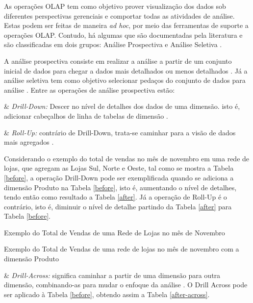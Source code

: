 As operações OLAP tem como objetivo prover visualização dos dados sob diferentes perspectivas gerenciais e comportar todas as atividades de análise. Estas podem ser feitas de maneira \textit{ad hoc}, por meio das ferramentas de suporte a operações OLAP. Contudo, há algumas que são documentadas pela literatura e são classificadas em dois grupos: Análise Prospectiva e Análise Seletiva .

A análise prospectiva consiste em realizar a análise a partir de um conjunto inicial de dados para chegar a dados mais detalhados ou menos detalhados \cite{Inmon1992}. Já a análise seletiva tem como objetivo selecionar pedaços do conjunto de dados para análise
 \cite{andre2000}. Entre as operações de análise prospectiva estão:


\begin{easylist}[itemize]

& \textit{Drill-Down:} Descer no nível de detalhes dos dados de uma dimensão. isto é, adicionar cabeçalhos de linha de tabelas de dimensão \cite{Kimball2002}.

& \textit{Roll-Up:} contrário de Drill-Down, trata-se caminhar para a visão de dados mais agregados . 


\end{easylist}

Considerando o exemplo do total de vendas no mês de novembro em uma rede de lojas, que agregam as Lojas Sul, Norte e Oeste, tal como se mostra a Tabela \ref{before}, a operação Drill-Down pode ser exemplificada quando se adiciona a dimensão Produto na Tabela \ref{before}, isto é, aumentando o nível de detalhes, tendo então como resultado a Tabela \ref{after}. Já a operação de Roll-Up é o contrário, isto é, diminuir o nível de detalhe partindo da Tabela 
\ref{after} para Tabela \ref{before}.

\begin{table}[!ht]
\centering

\caption{Exemplo do Total de Vendas de uma Rede de Lojas no mês de Novembro}
\label{before}
\end{table}
\FloatBarrier


\begin{table}[!ht]
\centering

\caption{Exemplo do Total de Vendas de uma rede de lojas no mês de novembro com a dimensão Produto}
\label{after}
\end{table}

\begin{easylist}[itemize]

& \textit{Drill-Across:} significa caminhar a partir de uma dimensão para
outra dimensão, combinando-as para mudar o enfoque da
análise \cite{andre2000}. O Drill Across pode ser aplicado à Tabela \ref{before}, obtendo assim a Tabela \ref{after-across}.
\end{easylist}

